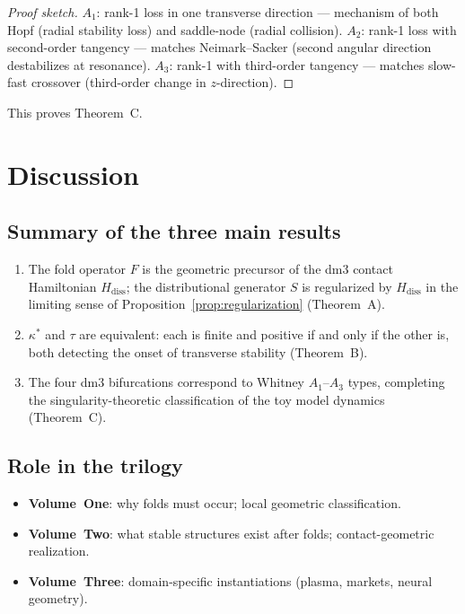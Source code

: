 \documentclass[12pt]{article}
\numberwithin{equation}{section}
\theoremstyle{remark}
\begin{document}
\begin{proof}[Proof sketch]
$A_1$: rank-1 loss in one transverse direction --- mechanism of
both Hopf (radial stability loss) and saddle-node (radial
collision). $A_2$: rank-1 loss with second-order tangency ---
matches Neimark--Sacker (second angular direction destabilizes
at resonance). $A_3$: rank-1 with third-order tangency ---
matches slow-fast crossover (third-order change in $z$-direction).
\end{proof}

This proves Theorem~C.

\section{Discussion}
\label{sec:discussion}

\subsection{Summary of the three main results}

\begin{enumerate}[label=(\arabic*)]
  \item The fold operator $F$ is the geometric precursor of the
        dm3 contact Hamiltonian $H_{\mathrm{diss}}$; the
        distributional generator $S$ is regularized by
        $H_{\mathrm{diss}}$ in the limiting sense of
        Proposition~\ref{prop:regularization} (Theorem~A).
  \item $\kappa^*$ and $\tau$ are equivalent: each is finite
        and positive if and only if the other is, both detecting
        the onset of transverse stability (Theorem~B).
  \item The four dm3 bifurcations correspond to Whitney
        $A_1$--$A_3$ types, completing the singularity-theoretic
        classification of the toy model dynamics (Theorem~C).
\end{enumerate}

\subsection{Role in the trilogy}

\begin{itemize}[leftmargin=*]
  \item \textbf{Volume~One}: why folds must occur;
        local geometric classification.
  \item \textbf{Volume~Two}: what stable structures exist after
        folds; contact-geometric realization.
  \item \textbf{Volume~Three}: domain-specific instantiations
        (plasma, markets, neural geometry).
\end{itemize}
\end{document}
